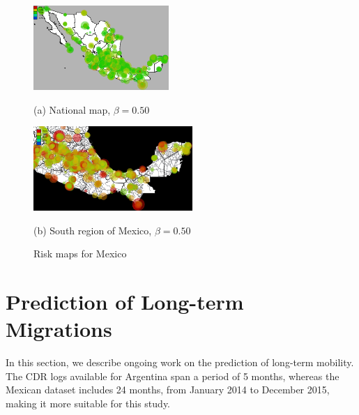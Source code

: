 \begin{figure}[ht!]
\begin{minipage}{.475\linewidth}
\centering
\includegraphics[width=0.95\columnwidth,height=3.2cm,keepaspectratio]
{figures/mexico_usuarios_volumen_circulos_allday_beta--50_min_volume--80_mexico_/mexico_usuarios_volumen_circulos_allday_beta--50_min_volume--80_mexico_}

(a) National map, $\beta = 0.50$
\end{minipage}
\begin{minipage}{.520\linewidth}
\centering
\includegraphics[width=0.95\columnwidth,height=3.2cm,keepaspectratio]
{figures/sur_usuarios_volumen_circulos_allday_beta--50_min_volume--80_mexico_/sur_usuarios_volumen_circulos_allday_beta--50_min_volume--80_mexico_}

(b) South region of Mexico, $\beta = 0.50$
\end{minipage}
%
\caption{Risk maps for Mexico}
\label{fig:mapas_mexico}
\end{figure}






\section{Prediction of Long-term Migrations} \label{long_term}

In this section, we describe ongoing work on the prediction of long-term mobility.
The CDR logs available for Argentina span a period of 5 months, 
whereas the Mexican dataset includes 24 months, from January 2014 to December 2015, making it more suitable for this study.

